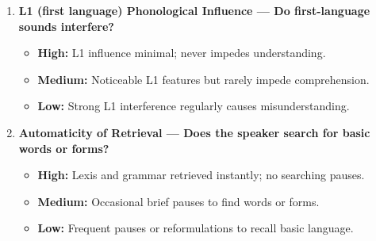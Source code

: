 \documentclass{report}
\begin{document}
\begin{enumerate}
  \item \textbf{L1 (first language) Phonological Influence — Do first-language sounds interfere?}
  \begin{itemize}
    \item \textbf{High:} L1 influence minimal; never impedes understanding.
    \item \textbf{Medium:} Noticeable L1 features but rarely impede comprehension.
    \item \textbf{Low:} Strong L1 interference regularly causes misunderstanding.
  \end{itemize}

  \item \textbf{Automaticity of Retrieval — Does the speaker search for basic words or forms?}
  \begin{itemize}
    \item \textbf{High:} Lexis and grammar retrieved instantly; no searching pauses.
    \item \textbf{Medium:} Occasional brief pauses to find words or forms.
    \item \textbf{Low:} Frequent pauses or reformulations to recall basic language.
  \end{itemize}
\end{enumerate}

\end{document}
